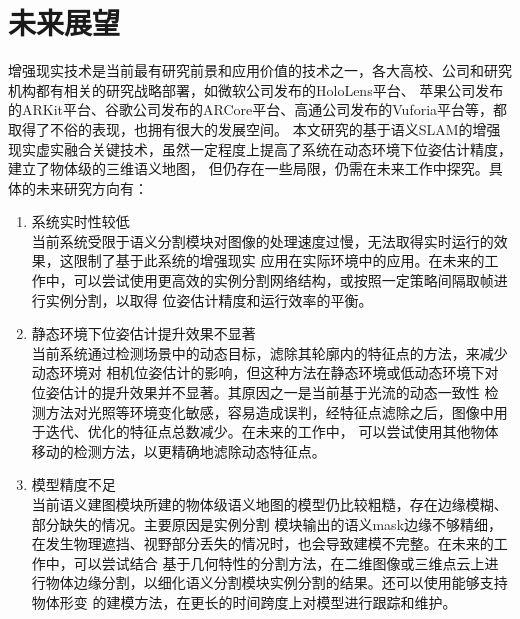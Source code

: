 \section{未来展望}
增强现实技术是当前最有研究前景和应用价值的技术之一，各大高校、公司和研究机构都有相关的研究战略部署，如微软公司发布的HoloLens平台、
苹果公司发布的ARKit平台、谷歌公司发布的ARCore平台、高通公司发布的Vuforia平台等，都取得了不俗的表现，也拥有很大的发展空间。
本文研究的基于语义SLAM的增强现实虚实融合关键技术，虽然一定程度上提高了系统在动态环境下位姿估计精度，建立了物体级的三维语义地图，
但仍存在一些局限，仍需在未来工作中探究。具体的未来研究方向有：
{
\setlist[enumerate]{}%
\begin{enumerate}[nosep]
    \item 系统实时性较低\\当前系统受限于语义分割模块对图像的处理速度过慢，无法取得实时运行的效果，这限制了基于此系统的增强现实
    应用在实际环境中的应用。在未来的工作中，可以尝试使用更高效的实例分割网络结构，或按照一定策略间隔取帧进行实例分割，以取得
    位姿估计精度和运行效率的平衡。
    \item 静态环境下位姿估计提升效果不显著\\当前系统通过检测场景中的动态目标，滤除其轮廓内的特征点的方法，来减少动态环境对
    相机位姿估计的影响，但这种方法在静态环境或低动态环境下对位姿估计的提升效果并不显著。其原因之一是当前基于光流的动态一致性
    检测方法对光照等环境变化敏感，容易造成误判，经特征点滤除之后，图像中用于迭代、优化的特征点总数减少。在未来的工作中，
    可以尝试使用其他物体移动的检测方法，以更精确地滤除动态特征点。
    \item 模型精度不足\\当前语义建图模块所建的物体级语义地图的模型仍比较粗糙，存在边缘模糊、部分缺失的情况。主要原因是实例分割
    模块输出的语义mask边缘不够精细，在发生物理遮挡、视野部分丢失的情况时，也会导致建模不完整。在未来的工作中，可以尝试结合
    基于几何特性的分割方法，在二维图像或三维点云上进行物体边缘分割，以细化语义分割模块实例分割的结果。还可以使用能够支持物体形变
    的建模方法，在更长的时间跨度上对模型进行跟踪和维护。
    
\end{enumerate}
}
